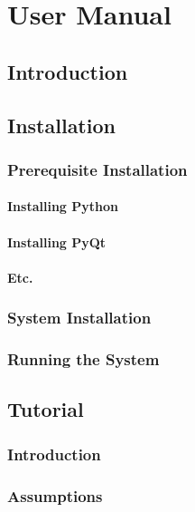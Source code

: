 \chapter{User Manual}

\section{Introduction}

\section{Installation}

\subsection{Prerequisite Installation}

\subsubsection{Installing Python}

\subsubsection{Installing PyQt}

\subsubsection{Etc.}

\subsection{System Installation}

\subsection{Running the System}

\section{Tutorial}

\subsection{Introduction}

\subsection{Assumptions}

